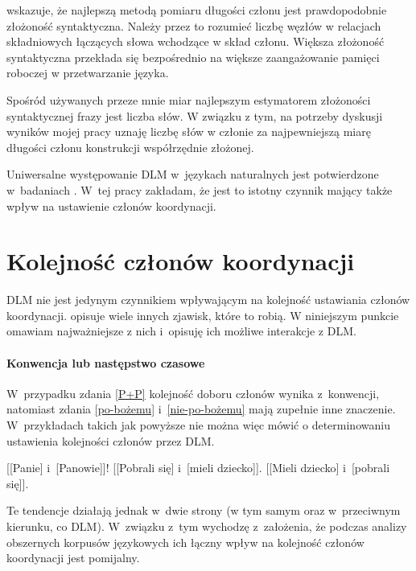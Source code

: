 \cite{lohmann2014english} wskazuje, że najlepszą metodą pomiaru długości członu jest prawdopodobnie złożoność syntaktyczna. Należy przez to rozumieć liczbę węzłów w relacjach składniowych łączących słowa wchodzące w skład członu. Większa złożoność syntaktyczna przekłada się bezpośrednio na większe zaangażowanie pamięci roboczej w przetwarzanie języka. 

Spośród używanych przeze mnie miar najlepszym estymatorem złożoności syntaktycznej frazy jest liczba słów. W związku z tym, na potrzeby dyskusji wyników mojej pracy uznaję liczbę słów w członie za najpewniejszą miarę długości członu konstrukcji współrzędnie złożonej.

Uniwersalne występowanie DLM w~językach naturalnych jest potwierdzone w~badaniach \citep{futrell2015large}. W~tej pracy zakładam, że jest to istotny czynnik mający także wpływ na ustawienie członów koordynacji. 

\section{Kolejność członów koordynacji}

DLM nie jest jedynym czynnikiem wpływającym na kolejność ustawiania członów koordynacji.
\cite{lohmann2014english} opisuje wiele innych zjawisk, które to robią. W niniejszym punkcie omawiam najważniejsze z nich i~opisuję ich możliwe interakcje z DLM.

\paragraph{Konwencja lub następstwo czasowe}

W~przypadku zdania \eqref{P+P} kolejność doboru członów wynika z~konwencji, natomiast zdania \eqref{po-bożemu} i~\eqref{nie-po-bożemu} mają zupełnie inne znaczenie. W~przykładach takich jak powyższe nie można więc mówić o determinowaniu ustawienia kolejności członów przez DLM. 

\begin{exe}
\ex \label{P+P} {[[Panie] i~[Panowie]]!}
\ex \label{po-bożemu} {[[Pobrali się] i~[mieli dziecko]].} %
\ex \label{nie-po-bożemu} {[[Mieli dziecko] i~[pobrali się]].}
\end{exe}

Te tendencje działają jednak w~dwie strony (w tym samym oraz w~przeciwnym kierunku, co DLM). W~związku z~tym wychodzę z~założenia, że podczas analizy obszernych korpusów językowych ich łączny wpływ na kolejność członów koordynacji jest pomijalny.

